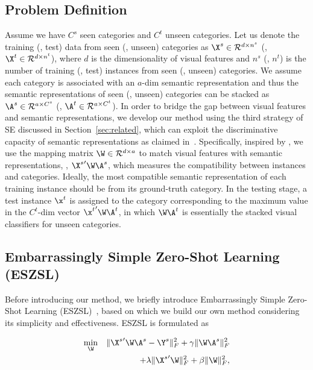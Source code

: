 \documentclass[journal]{IEEEtran}
\begin{document}
\subsection{Problem Definition} \label{sec:prob_def}
Assume we have $C^s$ seen categories and $C^t$ unseen categories. Let us denote the training (\resp, test) data from seen (\resp, unseen) categories as $\X^s\in\mathcal{R}^{d\times n^s}$ (\resp, $\X^t\in\mathcal{R}^{d\times n^t}$), where $d$ is the dimensionality of visual features and $n^s$ (\resp, $n^t$) is the number of training (\resp, test) instances  from seen (\resp, unseen) categories. We assume each category is associated with an $a$-dim semantic representation and thus the semantic representations of seen (\resp, unseen) categories can be stacked as $\A^s\in\mathcal{R}^{a\times C^s}$ (\resp, $\A^t\in\mathcal{R}^{a\times C^t}$). In order to bridge the gap between visual features and semantic representations, we develop our method using the third strategy of SE discussed in Section~\ref{sec:related}, which can exploit the discriminative capacity of semantic representations as claimed in~\cite{romera2015embarrassingly}.
Specifically, inspired by \cite{romera2015embarrassingly,guo2016transductive,qiao2016less}, we use the mapping matrix $\W\in\mathcal{R}^{d\times a}$ to match visual features with semantic representations, \ie, ${\X^s}'\W\A^s$, which measures the compatibility between instances and categories. 
Ideally, the most compatible semantic representation of each training instance should be from its ground-truth category. In the testing stage, a test instance $\x^t$ is assigned to the category corresponding to the maximum value in the $C^t$-dim vector ${\x^t}'\W\A^t$, in which $\W\A^t$ is essentially the stacked visual classifiers for unseen categories. 


\subsection{Embarrassingly Simple Zero-Shot Learning (ESZSL)}
Before introducing our method, we briefly introduce Embarrassingly Simple Zero-Shot Learning (ESZSL)~\cite{romera2015embarrassingly}, based on which we build our own method considering its simplicity and effectiveness. ESZSL is formulated as

\vspace{-15pt}
\begin{eqnarray} \label{eqn:ESZSL}
\min_{\W}&&\|{\X^s}'\W\A^s-\Y^s\|_F^2 + \gamma \|\W\A^s\|_F^2 \\
&&+\lambda \|{\X^s}'\W\|_F^2+\beta\|\W\|_F^2,
\end{eqnarray}
\end{document}
